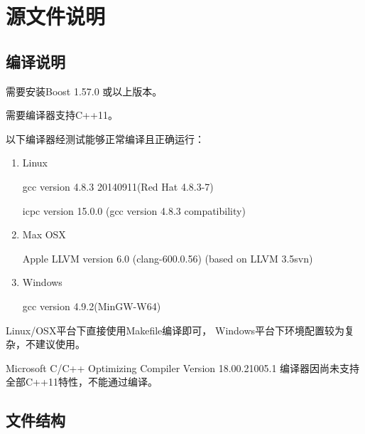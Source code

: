 \section{源文件说明}
    \subsection{编译说明}
        需要安装Boost 1.57.0 或以上版本。 
        
        需要编译器支持C++11。

        以下编译器经测试能够正常编译且正确运行：
        \begin{enumerate}
            \item 
            Linux
            
            gcc version 4.8.3 20140911(Red Hat 4.8.3-7)    

            icpc version 15.0.0 (gcc version 4.8.3 compatibility)
            \item
            Max OSX

            Apple LLVM version 6.0 (clang-600.0.56) (based on LLVM 3.5svn)
            \item 
            Windows

            gcc version 4.9.2(MinGW-W64)
        \end{enumerate}
        Linux/OSX平台下直接使用Makefile编译即可，%
        Windows平台下环境配置较为复杂，不建议使用。

        Microsoft C/C++ Optimizing Compiler Version 18.00.21005.1
        编译器因尚未支持全部C++11特性，不能通过编译。

    \subsection{文件结构}
